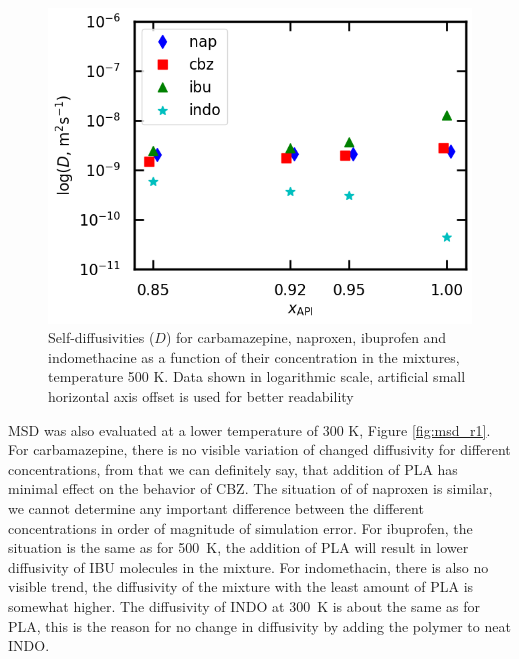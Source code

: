 \newpage


\begin{figure}[htb!]
	\centering
	\includegraphics[width=0.6\linewidth]{img/d.png} 
	\caption{Self-diffusivities ($D$) for carbamazepine, naproxen, ibuprofen and indomethacine as a function of their concentration in the mixtures, temperature 500 K. Data shown in logarithmic scale, artificial small horizontal axis offset is used for better readability}
	\label{fig:d}    
\end{figure}  

MSD was also evaluated at a lower temperature of 300 K, Figure \ref{fig:msd_r1}. For carbamazepine, there is no visible variation of changed diffusivity for different concentrations, from that we can definitely say, that addition of PLA has minimal effect on the behavior of CBZ. The situation of of naproxen is similar, we cannot determine any important difference between the different concentrations in order of magnitude of simulation error. For ibuprofen, the situation is the same as for 500~K, the addition of PLA will result in lower diffusivity of IBU molecules in the mixture. For indomethacin, there is also no visible trend, the diffusivity of the mixture with the least amount of PLA is somewhat higher. The diffusivity of INDO at 300~K is about the same as for PLA, this is the reason for no change in diffusivity by adding the polymer to neat INDO. 


